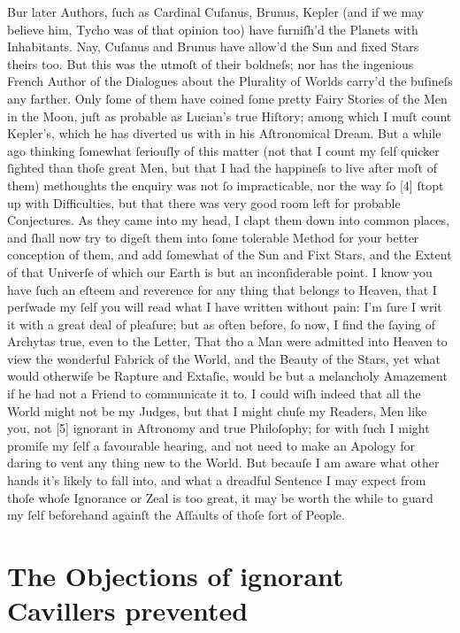 \documentclass[letterpaper]{book}
\begin{document}
Bur later Authors, ſuch as Cardinal Cuſanus, Brunus, Kepler (and if we may
believe him, Tycho was of that opinion too) have furniſh'd the Planets with
Inhabitants. Nay, Cuſanus and Brunus have allow'd the Sun and fixed Stars
theirs too. But this was the utmoſt of their boldneſs; nor has the ingenious
French Author of the Dialogues about the Plurality of Worlds carry'd the
buſineſs any farther. Only ſome of them have coined ſome pretty Fairy
Stories of the Men in the Moon, juſt as probable as Lucian's true Hiſtory;
among which I muſt count Kepler's, which he has diverted us with in his
Aſtronomical Dream. But a while ago thinking ſomewhat ſeriouſly of this
matter (not that I count my ſelf quicker ſighted than thoſe great Men, but
that I had the happineſs to live after moſt of them) methoughts the enquiry
was not ſo impracticable, nor the way ſo [4] ſtopt up with Difficulties, but
that there was very good room left for probable Conjectures. As they came
into my head, I clapt them down into common places, and ſhall now try to
digeſt them into ſome tolerable Method for your better conception of them,
and add ſomewhat of the Sun and Fixt Stars, and the Extent of that Univerſe
of which our Earth is but an inconſiderable point. I know you have ſuch an
eſteem and reverence for any thing that belongs to Heaven, that I perſwade
my ſelf you will read what I have written without pain: I'm ſure I writ it
with a great deal of pleaſure; but as often before, ſo now, I find the
ſaying of Archytas true, even to the Letter, That tho a Man were admitted
into Heaven to view the wonderful Fabrick of the World, and the Beauty of
the Stars, yet what would otherwiſe be Rapture and Extaſie, would be but a
melancholy Amazement if he had not a Friend to communicate it to. I could
wiſh indeed that all the World might not be my Judges, but that I might
chuſe my Readers, Men like you, not [5] ignorant in Aſtronomy and true
Philoſophy; for with ſuch I might promiſe my ſelf a favourable hearing, and
not need to make an Apology for daring to vent any thing new to the World.
But becauſe I am aware what other hands it's likely to fall into, and what a
dreadful Sentence I may expect from thoſe whoſe Ignorance or Zeal is too
great, it may be worth the while to guard my ſelf beforehand againſt the
Aſſaults of thoſe ſort of People.


\section{The Objections of ignorant Cavillers prevented}
\end{document}
